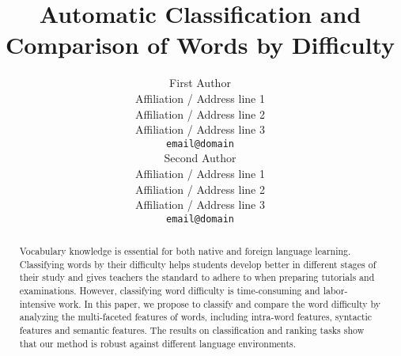 \documentclass[11pt]{article}
\title{Automatic Classification and Comparison of Words by	Difficulty}
\author{First Author \\
  Affiliation / Address line 1 \\
  Affiliation / Address line 2 \\
  Affiliation / Address line 3 \\
  {\tt email@domain} \\\And
  Second Author \\
  Affiliation / Address line 1 \\
  Affiliation / Address line 2 \\
  Affiliation / Address line 3 \\
  {\tt email@domain} \\}
\date{}
\newcommand{\JQ}[1]{\textcolor{purple}{JQ: #1}}
\begin{document}
\maketitle
\begin{abstract}
  Vocabulary knowledge is essential for both native and foreign language 
  learning. Classifying words by their difficulty helps students develop
  better in different stages of their study and gives teachers the standard
  to adhere to when preparing tutorials and examinations.
  However, classifying word difficulty is 
  time-consuming and labor-intensive work. 
  In this paper, we propose to classify and compare the word difficulty by analyzing the multi-faceted features 
  of words, including intra-word features, syntactic features and 
  semantic features.  The results on classification and ranking tasks show that our method is robust 
  against different language environments.
\end{abstract}















\end{document}
